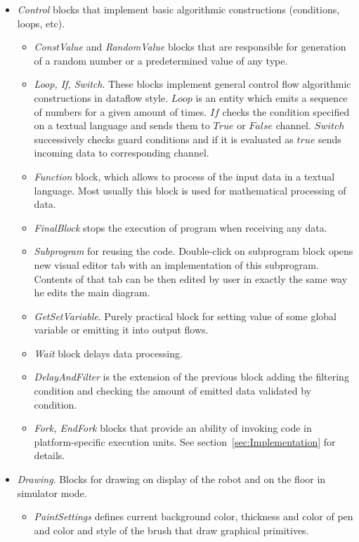 \documentclass[conference,compsoc]{IEEEtran}
\begin{document}
\begin{itemize}
\item \textit{Control} blocks that implement basic algorithmic constructions (conditions, loops, etc).
\begin{itemize}
\item \textit{ConstValue} and \textit{RandomValue} blocks that are responsible for generation of a random number or a predetermined value of any type.
\item \textit{Loop, If, Switch}. These blocks implement general control flow algorithmic constructions in dataflow style. $Loop$ is an entity which emits a sequence of numbers for a given amount of times. $If$ checks the condition specified on a textual language and sends them to $True$ or $False$ channel. $Switch$ successively checks guard conditions and if it is evaluated as $true$ sends incoming data to corresponding channel.  	
\item \textit{Function} block, which allows to process of the input data in a textual language. Most usually this block is used for mathematical processing of data.
\item \textit{FinalBlock} stops the execution of program when receiving any data. 
\item \textit{Subprogram} for reusing the code. Double-click on subprogram block opens new visual editor tab with an implementation of this subprogram. Contents of that tab can be then edited by user in exactly the same way he edits the main diagram.
\item \textit{GetSetVariable}. Purely practical block for setting value of some global variable or emitting it into output flows.
\item \textit{Wait} block delays data processing.
\item \textit{DelayAndFilter} is the extension of the previous block adding the filtering condition and checking the amount of emitted data validated by condition.
\item \textit{Fork, EndFork} blocks that provide an ability of invoking code in platform-specific execution units. See section~\ref{sec:Implementation} for details.
\end{itemize} 
\item \textit{Drawing}. Blocks for drawing on display of the robot and on the floor in simulator mode.
\begin{itemize}
\item \textit{PaintSettings} defines current background color, thickness and color of pen and color and style of the brush that draw graphical primitives.

\end{itemize}
\end{itemize}
\end{document}
